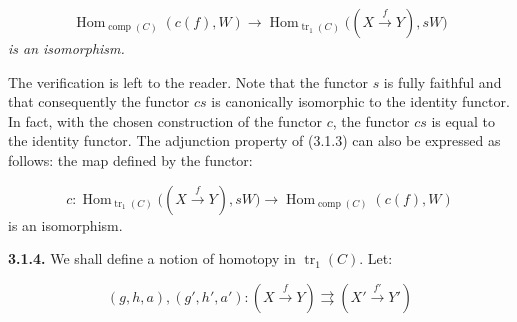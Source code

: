 \begin{equation*}
  \operatorname{Hom}_{\operatorname{comp}(C)}(c(f),W)
  \longrightarrow
  \operatorname{Hom}_{\operatorname{tr}_1(C)}
    \bigl((X\xrightarrow{f}Y),sW\bigr)
\end{equation*}
\emph{is an isomorphism.}

The verification is left to the reader.
Note that the functor $s$ is fully faithful and that consequently the functor
$cs$ is canonically isomorphic to the identity functor.
In fact, with the chosen construction of the functor $c$, the functor $cs$ is
equal to the identity functor.
The adjunction property of (3.1.3) can also be expressed as follows: the map
defined by the functor:

\begin{equation*}
  c\colon
  \operatorname{Hom}_{\operatorname{tr}_1(C)}
    \bigl((X\xrightarrow{f}Y),sW\bigr)
  \longrightarrow
  \operatorname{Hom}_{\operatorname{comp}(C)}(c(f),W)
\end{equation*}
is an isomorphism.

\noindent\textbf{3.1.4.}\quad
We shall define a notion of homotopy in $\operatorname{tr}_1(C)$. Let:

\begin{equation*}
  (g,h,a),(g',h',a')\colon
  (X\xrightarrow{f}Y)
  \rightrightarrows
  (X'\xrightarrow{f'}Y')
\end{equation*}
